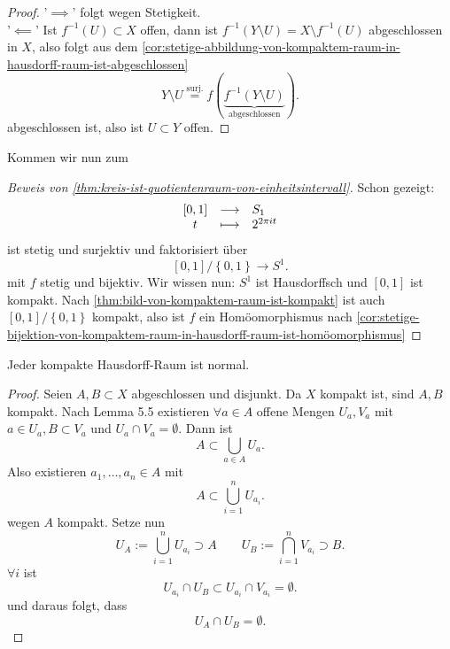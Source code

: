 \begin{proof}
    '$\implies$' folgt wegen Stetigkeit. \\
    '$\impliedby$' Ist $f^{-1}(U) \subset X$ offen, dann ist $f^{-1}(Y \setminus U ) = X \setminus f^{-1}(U)$ abgeschlossen in $X$, also folgt aus dem \autoref{cor:stetige-abbildung-von-kompaktem-raum-in-hausdorff-raum-ist-abgeschlossen}
     \[
         Y \setminus U \stackrel{\text{surj.}}{=}   f\left( \underbrace{f^{-1}\left( Y \setminus U \right)}_{\text{abgeschlossen}}  \right) 
    .\] 
    abgeschlossen ist, also ist $U\subset Y$ offen.
\end{proof}
Kommen wir nun zum
\begin{proof}[Beweis von \autoref{thm:kreis-ist-quotientenraum-von-einheitsintervall}]
    Schon gezeigt:
        \begin{equation*}
        \begin{array}{c c l} 
            [0,1] & \longrightarrow & S_1 \\
        t & \longmapsto &  2^{2\pi it}
        \end{array}
    \end{equation*}
    ist stetig und surjektiv und faktorisiert über
    \[
        [0,1] /\left \{0,1\right\}  \to  S^1
    .\] 
    mit $f$ stetig und bijektiv. Wir wissen nun:  $S^1$ ist Hausdorffsch und  $[0,1]$ ist kompakt. Nach \autoref{thm:bild-von-kompaktem-raum-ist-kompakt} ist auch  $[0,1] /\left \{0,1\right\} $ kompakt, also ist $f$ ein Homöomorphismus nach \autoref{cor:stetige-bijektion-von-kompaktem-raum-in-hausdorff-raum-ist-homöomorphismus}
\end{proof}


\begin{theorem}\label{thm:kompakter-hausdorff-raum-ist-normal}
    Jeder kompakte Hausdorff-Raum ist normal.
\end{theorem}
\begin{proof}
    Seien $A,B\subset X$ abgeschlossen und disjunkt. Da $X$ kompakt ist, sind  $A,B$ kompakt. Nach Lemma 5.5 existieren  $\forall a\in A$ offene Mengen $U_a, V_a$ mit $a\in U_a, B\subset V_a$ und $U_a \cap V_a = \emptyset$. Dann ist
    \[
    A \subset \bigcup_{a\in A} U_a
    .\] 
    Also existieren $a_1,\ldots,a_n\in A$ mit
    \[
    A\subset \bigcup_{i=1}^n U_{a_i}
    .\] 
    wegen $A$ kompakt. Setze nun
    \[
    U_A := \bigcup_{i=1}^n U_{a_i}\supset A \qquad U_B := \bigcap_{i=1}^n V_{a_i}\supset B
    .\] 
$\forall i$ ist 
\[
    U_{a_i} \cap U_B \subset U_{a_i} \cap V_{a_i} = \emptyset
.\] 
und daraus folgt, dass
\[
U_A \cap U_B = \emptyset
.\] 
\end{proof}

